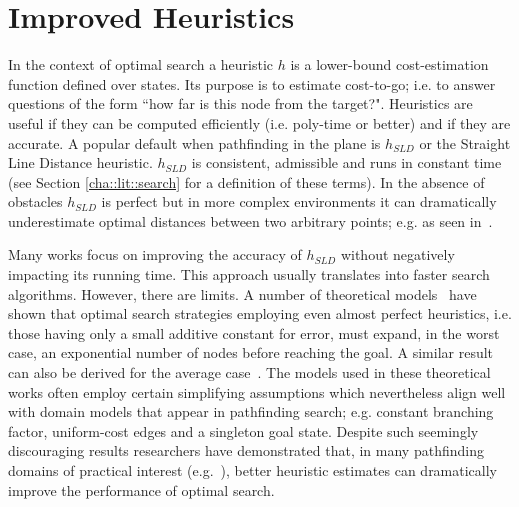 \section{Improved Heuristics}
\label{cha::lit::heuristics}

%
In the context of optimal search a heuristic $h$ is a lower-bound
cost-estimation function defined over states. Its purpose is to estimate
cost-to-go; i.e. to answer questions of the form ``how far is this node from
the target?".  Heuristics are useful if they can be computed efficiently (i.e.
poly-time or better) and if they are accurate.  A popular default when
pathfinding in the plane is $h_{SLD}$ or the Straight Line Distance heuristic.
$h_{SLD}$ is consistent, admissible and runs in constant time (see  Section
\ref{cha::lit::search} for a definition of these terms).  In the absence of
obstacles $h_{SLD}$ is perfect but in more complex environments it can
dramatically underestimate optimal distances between two arbitrary points;
e.g. as seen in~\citep{goldberg05}.

Many works focus on improving the accuracy of $h_{SLD}$ without negatively
impacting its running time. This approach usually translates into faster
search algorithms. However, there are limits.  A number of theoretical
models~\citep{pohl77,helmert08} have shown that optimal search strategies
employing even almost perfect heuristics, i.e. those having only a small
additive constant for error, must expand, in the worst case, an exponential
number of nodes before reaching the goal.  A similar result can also be
derived for the average case~\citep{pearl84}.  The models used in these
theoretical works often employ certain simplifying assumptions which
nevertheless align well with domain models that appear in pathfinding
search; e.g.  constant branching factor, uniform-cost edges and a singleton 
goal state.
Despite such seemingly discouraging results researchers have demonstrated
that, in many pathfinding domains of practical interest
(e.g.~\citep{sturtevant12}), better heuristic estimates can dramatically
improve the performance of optimal search.

